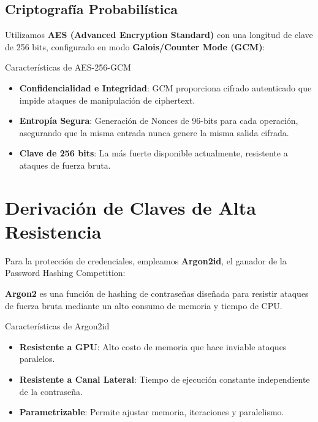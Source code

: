 \subsection{Criptografía Probabilística}

Utilizamos \textbf{AES (Advanced Encryption Standard)} con una longitud de clave de 256 bits, configurado en modo \textbf{Galois/Counter Mode (GCM)}:

\begin{caja}{Características de AES-256-GCM}
\begin{itemize}
\item \textbf{Confidencialidad e Integridad}: GCM proporciona cifrado autenticado que impide ataques de manipulación de ciphertext.
\item \textbf{Entropía Segura}: Generación de Nonces de 96-bits para cada operación, asegurando que la misma entrada nunca genere la misma salida cifrada.
\item \textbf{Clave de 256 bits}: La más fuerte disponible actualmente, resistente a ataques de fuerza bruta.
\end{itemize}
\end{caja}


\section{Derivación de Claves de Alta Resistencia}

Para la protección de credenciales, empleamos \textbf{Argon2id}, el ganador de la Password Hashing Competition:

\begin{definicion}
\textbf{Argon2} es una función de hashing de contraseñas diseñada para resistir ataques de fuerza bruta mediante un alto consumo de memoria y tiempo de CPU.
\end{definicion}


\begin{caja}{Características de Argon2id}
\begin{itemize}
\item \textbf{Resistente a GPU}: Alto costo de memoria que hace inviable ataques paralelos.
\item \textbf{Resistente a Canal Lateral}: Tiempo de ejecución constante independiente de la contraseña.
\item \textbf{Parametrizable}: Permite ajustar memoria, iteraciones y paralelismo.
\end{itemize}
\end{caja}

